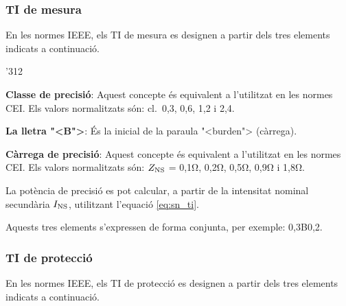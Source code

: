 \subsubsection{TI de mesura}

En les normes \textsf{IEEE}, els TI de mesura  es designen a partir
dels tres elements indicats a continuaci\'{o}.

\begin{dingautolist}{'312}
    \item \textbf{Classe de precisi\'{o}}: Aquest concepte \'{e}s equivalent
    a l'utilitzat en les normes \textsf{CEI}. Els valors
    normalitzats s\'{o}n: cl.~0,3, 0,6, 1,2 i 2,4.
    \item \textbf{La lletra {"<}B{">}}: \'{E}s la inicial de la paraula
    {"<}burden{">}  (c\`{a}rrega).
    \item \textbf{C\`{a}rrega de precisi\'{o}}: Aquest concepte \'{e}s equivalent
    a l'utilitzat en les normes \textsf{CEI}. Els valors
    normalitzats s\'{o}n: $Z_\mathrm{NS}$ = 0,1\unit{\ohm}, 0,2\unit{\ohm},
     0,5\unit{\ohm}, 0,9\unit{\ohm} i 1,8\unit{\ohm}.

    La pot\`{e}ncia de precisi\'{o} es pot calcular, a partir de la
    intensitat nominal secund\`{a}ria $I_\mathrm{NS}$, utilitzant l'equaci\'{o}
    \eqref{eq:sn_ti}.
\end{dingautolist}

Aquests tres elements s'expressen de forma conjunta, per exemple:
0,3B0,2.

\subsubsection{TI de protecci\'{o}}

En les normes \textsf{IEEE}, els TI de protecci\'{o} es designen a
partir dels tres elements indicats a continuaci\'{o}.

